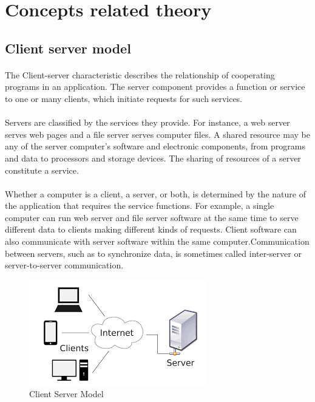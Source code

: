 \documentclass[10pt,a4paper]{article}
\begin{document}
\section{Concepts related theory}
\subsection{Client server model}
	\paragraph{} The Client-server characteristic describes the relationship of cooperating programs in an application. The server component provides a function or service to one or many clients, which initiate requests for such services.
	\paragraph{}Servers are classified by the services they provide. For instance, a web server serves web pages and a file server serves computer files. A shared resource may be any of the server computer's software and electronic components, from programs and data to processors and storage devices. The sharing of resources of a server constitute a service.
	\paragraph{} Whether a computer is a client, a server, or both, is determined by the nature of the application that requires the service functions. For example, a single computer can run web server and file server software at the same time to serve different data to clients making different kinds of requests. Client software can also communicate with server software within the same computer.Communication between servers, such as to synchronize data, is sometimes called inter-server or server-to-server communication.
		
		\begin{figure}[htb!]
			\centering
			\includegraphics{images.png}
			\caption{Client Server Model}
			\label{Client Server Model}
		\end{figure}
		
\end{document}
